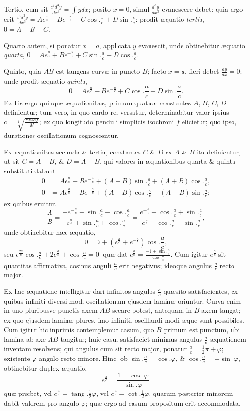 Tertio, cum sit $\frac{c^4d^3y}{dx^3}=\int ydx$; posito $x=0$, simul $\frac{d^3y}{dx^3}$ evanescere debet: quia ergo erit $\frac{c^3d^3y}{dx^3}=Ae^{\frac xc}-Be^{-\frac xc}-C\cos.\frac xc+D\sin.\frac xc$: prodit æquatio \textit{tertia}, $0=A-B-C$.

Quarto autem, si ponatur $x=a$, applicata $y$ evanescit, unde obtinebitur æquatio \textit{quarta}, $0=Ae^{\frac ac}+Be^{-\frac ac}+C\sin.\frac ac+D\cos.\frac ac$.

Quinto, quia $AB$ est tangens curvæ in puncto $B$; facto $x=a$, fieri debet $\frac{dy}{dx}=0$: unde prodit æquatio \textit{quinta},
\[0=Ae^{\frac ac}-Be^{-\frac ac}+C\cos.\frac ac-D\sin.\frac ac.\]
Ex his ergo quinque æquationibus, primum quatuor constantes $A$, $B$, $C$, $D$ definientur; tum vero, in quo cardo rei versatur, determinabitur valor ipsius $c=\sqrt[4]{\frac{Ekkaf}M}$; ex quo longitudo penduli simplicis isochroni $f$ elicietur; quo ipso, durationes oscillationum cognoscentur.

Ex æquationibus secunda \& tertia, constantes $C$ \& $D$ ex $A$ \& $B$ ita definientur, ut sit $C=A-B$, \& $D=A+B$.
qui valores in æquationibus quarta \& quinta substituti dabunt
\[\begin{aligned}
0&=Ae^{\frac ac}+Be^{-\frac ac}+(A-B)\sin.\frac ac+(A+B)\cos.\frac ac,\\
0&=Ae^{\frac ac}-Be^{-\frac ac}+(A-B)\cos.\frac ac-(A+B)\sin.\frac ac;
\end{aligned}\]
ex quibus eruitur,
\[\frac AB=\frac{-e^{-\frac ac}+\sin.\frac ac-\cos.\frac ac}{e^{\frac ac}+\sin.\frac ac+\cos.\frac ac}=\frac{e^{-\frac ac}+\cos.\frac ac+\sin.\frac ac}{e^{\frac ac}+\cos.\frac ac-\sin.\frac ac},\]
unde obtinebitur hæc æquatio,
\[0=2+(e^{\frac ac}+e^{-\frac ac})\cos.\frac ac,\]
seu $e^{\frac{2a}c}\cos.\frac ac+2e^{\frac ac}+\cos.\frac ac=0$, quæ dat $e^{\frac ac}=\frac{-1\pm\sin.\frac ac}{\cos.\frac ac}$. Cum igitur $e^{\frac ac}$ sit quantitas affirmativa, cosinus anguli $\frac ac$ erit negativus; ideoque angulus $\frac ac$ recto major.

Ex hac æquatione intelligitur dari infinitos angulos $\frac ac$ quæsito satisfacientes, ex quibus infiniti diversi modi oscillationum ejusdem laminæ oriuntur. Curva enim in uno pluribusve punctis axem $AB$ secare potest, antequam in $B$ axem tangat; ex quo ejusdem laminæ plures, imo infiniti, oscillandi modi æque sunt possibiles. Cum igitur hic inprimis contemplemur casum, quo $B$ primum est punctum, ubi lamina ab axe $AB$ tangitur; huic casui satisfaciet minimus angulus $\frac ac$ æquationem inventam resolvens; qui angulus cum sit recto major, ponatur $\frac ac=\frac12\pi+\varphi$; existente $\varphi$ angulo recto minore. Hinc, ob $\sin.\frac ac=\cos.\varphi$, \& $\cos.\frac ac=-\sin.\varphi$, obtinebitur duplex æquatio,
\[e^{\frac ac}=\frac{1\mp\cos.\varphi}{\sin.\varphi}.\]
quæ præbet, vel $e^{\frac ac}=\operatorname{tang}.\frac12\varphi$, vel $e^{\frac ac}=\cot.\frac12\varphi$, quarum posterior minorem dabit valorem pro angulo $\varphi$; quæ ergo ad casum propositum erit accommodata.


